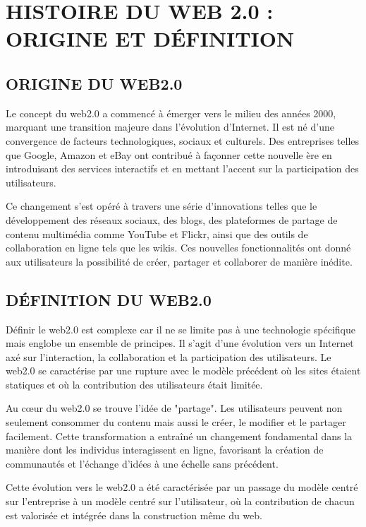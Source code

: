 \documentclass[12pt,a4paper]{article} %
\begin{document}
	\section{\textbf{HISTOIRE DU WEB 2.0 : ORIGINE ET DÉFINITION}}
	
	\subsection{\textbf{ORIGINE DU WEB2.0}}
	Le concept du web2.0 a commencé à émerger vers le milieu des années 2000, marquant une transition majeure dans l'évolution d'Internet. Il est né d'une convergence de facteurs technologiques, sociaux et culturels. Des entreprises telles que Google, Amazon et eBay ont contribué à façonner cette nouvelle ère en introduisant des services interactifs et en mettant l'accent sur la participation des utilisateurs.
	
	Ce changement s'est opéré à travers une série d'innovations telles que le développement des réseaux sociaux, des blogs, des plateformes de partage de contenu multimédia comme YouTube et Flickr, ainsi que des outils de collaboration en ligne tels que les wikis. Ces nouvelles fonctionnalités ont donné aux utilisateurs la possibilité de créer, partager et collaborer de manière inédite.
	
	
	\subsection{\textbf{DÉFINITION DU WEB2.0}}
	Définir le web2.0 est complexe car il ne se limite pas à une technologie spécifique mais englobe un ensemble de principes. Il s'agit d'une évolution vers un Internet axé sur l'interaction, la collaboration et la participation des utilisateurs. Le web2.0 se caractérise par une rupture avec le modèle précédent où les sites étaient statiques et où la contribution des utilisateurs était limitée.
	
	Au cœur du web2.0 se trouve l'idée de "partage". Les utilisateurs peuvent non seulement consommer du contenu mais aussi le créer, le modifier et le partager facilement. Cette transformation a entraîné un changement fondamental dans la manière dont les individus interagissent en ligne, favorisant la création de communautés et l'échange d'idées à une échelle sans précédent.
	
	Cette évolution vers le web2.0 a été caractérisée par un passage du modèle centré sur l'entreprise à un modèle centré sur l'utilisateur, où la contribution de chacun est valorisée et intégrée dans la construction même du web.
	
\end{document}

